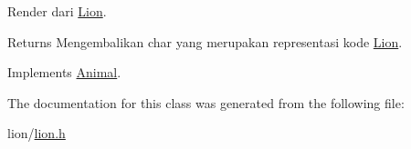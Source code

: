 Render dari \hyperlink{classLion}{Lion}. 

\begin{DoxyReturn}{Returns}
Mengembalikan char yang merupakan representasi kode \hyperlink{classLion}{Lion}. 
\end{DoxyReturn}


Implements \hyperlink{classAnimal_a43a47c0f41d211128e04abc6add53def}{Animal}.



The documentation for this class was generated from the following file\+:\begin{DoxyCompactItemize}
\item 
lion/\hyperlink{lion_8h}{lion.\+h}\end{DoxyCompactItemize}
